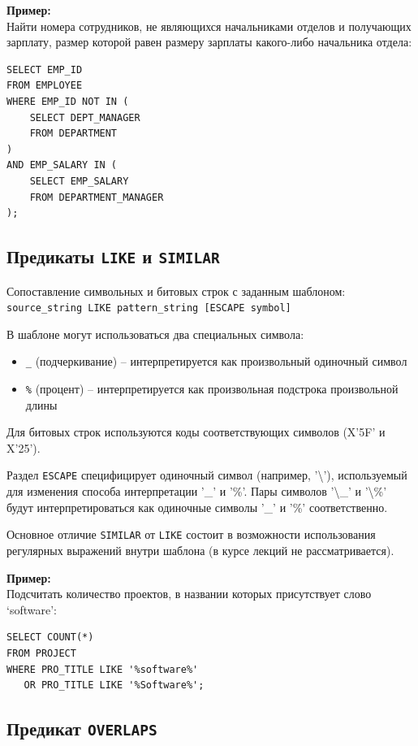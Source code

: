 \documentclass[a4paper,12pt]{article}
\begin{document}
\textbf{Пример:}\\
Найти номера сотрудников, не являющихся начальниками отделов и получающих зарплату, размер которой равен размеру зарплаты какого-либо начальника отдела:
\begin{lstlisting}
SELECT EMP_ID 
FROM EMPLOYEE 
WHERE EMP_ID NOT IN (
    SELECT DEPT_MANAGER 
    FROM DEPARTMENT
) 
AND EMP_SALARY IN (
    SELECT EMP_SALARY 
    FROM DEPARTMENT_MANAGER
);
\end{lstlisting}

\subsection{Предикаты \texttt{LIKE} и \texttt{SIMILAR}}

Сопоставление символьных и битовых строк с заданным шаблоном:
\texttt{source\_string LIKE pattern\_string [ESCAPE symbol]}

В шаблоне могут использоваться два специальных символа:
\begin{itemize}
    \item \texttt{\_} (подчеркивание) – интерпретируется как произвольный одиночный символ
    \item \texttt{\%} (процент) – интерпретируется как произвольная подстрока произвольной длины
\end{itemize}

Для битовых строк используются коды соответствующих символов (X'5F' и X'25').

Раздел \texttt{ESCAPE} специфицирует одиночный символ (например, '\textbackslash'), используемый для изменения способа интерпретации '\_' и '\%'. Пары символов '\textbackslash\_' и '\textbackslash\%' будут интерпретироваться как одиночные символы '\_' и '\%' соответственно.

Основное отличие \texttt{SIMILAR} от \texttt{LIKE} состоит в возможности использования регулярных выражений внутри шаблона (в курсе лекций не рассматривается).

\textbf{Пример:}\\
Подсчитать количество проектов, в названии которых присутствует слово ‘software’:
\begin{lstlisting}
SELECT COUNT(*) 
FROM PROJECT 
WHERE PRO_TITLE LIKE '%software%' 
   OR PRO_TITLE LIKE '%Software%';
\end{lstlisting}

\subsection{Предикат \texttt{OVERLAPS}}
\end{document}
